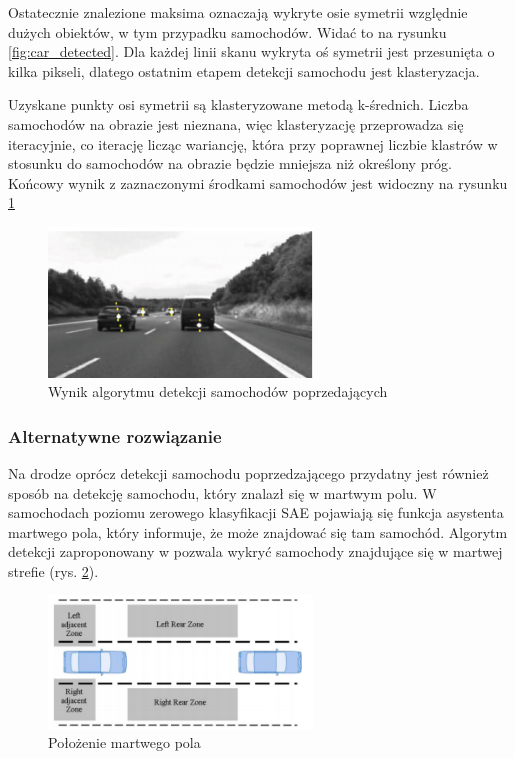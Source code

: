 Ostatecznie znalezione maksima oznaczają wykryte osie symetrii względnie dużych obiektów, w tym przypadku samochodów. 
Widać to na rysunku \ref{fig:car_detected}. 
Dla każdej linii skanu wykryta oś symetrii jest przesunięta o kilka pikseli, dlatego ostatnim etapem detekcji samochodu jest klasteryzacja.

Uzyskane punkty osi symetrii są klasteryzowane metodą k-średnich. 
Liczba samochodów na obrazie jest nieznana, więc klasteryzację przeprowadza się iteracyjnie, co iterację licząc wariancję, która przy poprawnej liczbie klastrów w stosunku do samochodów na obrazie będzie mniejsza niż określony próg. 
Końcowy wynik z zaznaczonymi środkami samochodów jest widoczny na rysunku \ref{fig:car_end}

\begin{figure}
  \centering
  \includegraphics[width=7cm]{img/car_end.png}
  \caption{Wynik algorytmu detekcji samochodów poprzedających\cite{T1}}
  \label{fig:car_end}
\end{figure}

\subsubsection{Alternatywne rozwiązanie}

Na drodze oprócz detekcji samochodu poprzedzającego przydatny jest również sposób na detekcję samochodu, który znalazł się w martwym polu. 
W samochodach poziomu zerowego klasyfikacji SAE pojawiają się funkcja asystenta martwego pola, który informuje, że może znajdować się tam samochód.
Algorytm detekcji zaproponowany w \cite{T11} pozwala wykryć samochody znajdujące się w martwej strefie (rys. \ref{fig:car_detection2_blind_spot2}).

\begin{figure}
  \centering
  \includegraphics[width=7cm]{img/car_detection2_blind_spot.png}
  \caption{Położenie martwego pola\cite{T12}}
  \label{fig:car_detection2_blind_spot2}
\end{figure}

